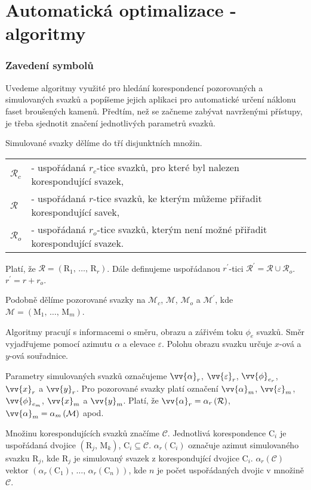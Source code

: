 \part{Automatická optimalizace - algoritmy}

\section{Zavedení symbolů}
	Uvedeme algoritmy využité pro hledání korespondencí pozorovaných a simulovaných svazků a popíšeme jejich aplikaci pro automatické určení náklonu faset broušených kamenů. 
	Předtím, než se začneme zabývat navrženými přístupy, je třeba sjednotit značení jednotlivých parametrů svazků. 
	
	Simulované svazky dělíme do tří disjunktních množin. 
	
	\begin{tabular}{l l}
	$\mathcal{R}_c$ & - uspořádaná $r_c$-tice svazků, pro které byl nalezen korespondující svazek,\\
	$\mathcal{R}$   & - uspořádaná $r$-tice svazků, ke kterým můžeme přiřadit korespondující savek, \\
	$\mathcal{R}_o$ & - uspořádaná $r_o$-tice svazků, kterým není možné přiřadit korespondující svazek.  \\
	\end{tabular}	

Platí, že $\mathcal{R} = \left(\mathrm{R}_1 ,\,\dots,\, \mathrm{R}_r\right)$. Dále definujeme uspořádanou $r^\prime$-tici $\mathcal{R}^\prime = \mathcal{R} \cup \mathcal{R}_o$. $r^\prime = r +r_o $.
	
	Podobně dělíme pozorované svazky na $\mathcal{M}_c$, $\mathcal{M}$, $\mathcal{M}_o$ a $ \mathcal{M}^\prime$, kde $\mathcal{M} = \left(\mathrm{M}_1 ,\,\dots,\, \mathrm{M}_m\right)$.
	 
	 Algoritmy pracují s informacemi o směru, obrazu a zářivém toku $\phi_e$ svazků. Směr vyjadřujeme pomocí azimutu $\alpha$ a elevace $\varepsilon$. Polohu obrazu svazku určuje $x$-ová a $y$-ová souřadnice.
	
	 Parametry simulovaných svazků označujeme $\vv{\alpha}_{r}$, $\vv{\varepsilon}_{r}$, $\vv{\phi}_{e_{r}}$, $\vv{x}_r$  a $\vv{y}_r$. Pro pozorované svazky platí označení $\vv{\alpha}_{m}$, $\vv{\varepsilon}_{m}$, $\vv{\phi}_{e_{m}}$, $\vv{x}_m$  a $\vv{y}_m$. Platí, že $\vv{\alpha}_{r} = \alpha_{r}\left(\mathcal{R}\right)$, $\vv{\alpha}_{m} = \alpha_{m}\left(\mathcal{M}\right)$ apod. 

Množinu korespondujících svazků značíme $\mathcal{C}$. Jednotlivá korespondence $\mathrm{C}_i$ je uspořádaná dvojice $\left(\mathrm{R}_j,\,\mathrm{M}_k \right)$, $\mathrm{C}_i \subseteq \mathcal{C}$. $\alpha_{r}(\mathrm{C}_i)$ označuje azimut simulovaného  svazku $\mathrm{R}_j$, kde $\mathrm{R}_j$ je simulovaný svazek z korespondující dvojice $\mathrm{C}_i$. $\alpha_{r}(\mathcal{C})$ vektor $\left(\alpha_{r}(\mathrm{C}_1),\,\dots,\,\alpha_{r}(\mathrm{C}_n)\right)$, kde $n$ je počet uspořádaných dvojic v množině $\mathcal{C}$.
	
